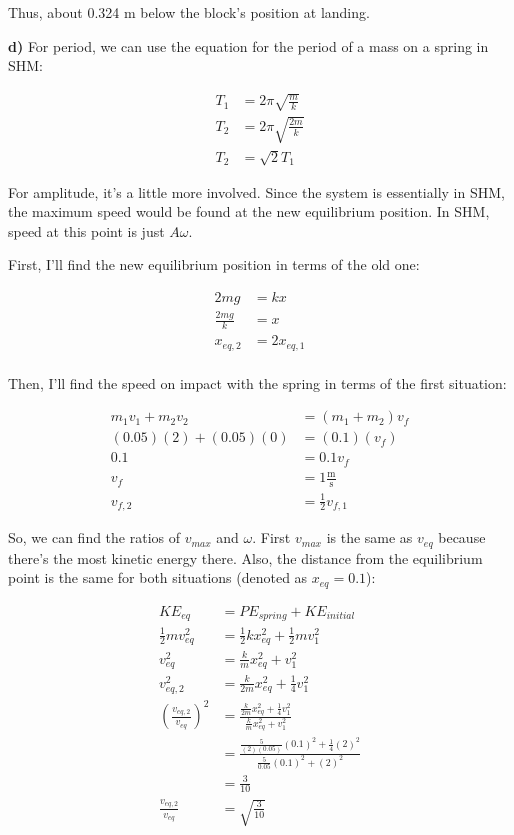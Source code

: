 \documentclass{article}
\begin{document}
Thus, about 0.324 m below the block's position at landing.

\vspace{1cm}

\large\textbf{d)} For period, we can use the equation for the period of a mass on a spring in SHM:

\begin{align*}
    T_1 &= 2\pi\sqrt{\frac{m}{k}} \\
    T_2 &= 2\pi\sqrt{\frac{2m}{k}} \\
    T_2 &= \sqrt{2}T_1
\end{align*}

For amplitude, it's a little more involved. Since the system is essentially in SHM, the maximum speed would be found at the new equilibrium position. In SHM, speed at this point is just $A\omega$.

First, I'll find the new equilibrium position in terms of the old one:

\begin{align*}
    2mg &= kx \\
    \frac{2mg}{k} &= x \\
    x_{eq,2} &= 2x_{eq,1} \\
\end{align*}

Then, I'll find the speed on impact with the spring in terms of the first situation:

\begin{align*}
    m_1v_1+m_2v_2 &= (m_1+m_2)v_f \\
    (0.05)(2) + (0.05)(0) &= (0.1)(v_f) \\
    0.1 &= 0.1v_f \\
    v_f &= 1 \frac{\text{m}}{\text{s}} \\
    v_{f,2} &= \frac{1}{2}v_{f,1} 
\end{align*}

So, we can find the ratios of $v_{max}$ and ${\omega}$. First $v_{max}$ is the same as $v_{eq}$ because there's the most kinetic energy there. Also, the distance from the equilibrium point is the same for both situations (denoted as $x_{eq}=0.1$):

\begin{align*}
    KE_{eq} &= PE_{spring} + KE_{initial} \\
    \frac{1}{2}mv_{eq}^2 &= \frac{1}{2}kx_{eq}^2 + \frac{1}{2}mv_1^2 \\
    v_{eq}^2 &= \frac{k}{m} x_{eq}^2 + v_1^2 \\
    v_{eq,2}^2 &= \frac{k}{2m} x_{eq}^2 + \frac{1}{4}v_1^2 \\
    \left(\frac{v_{eq,2}}{v_{eq}}\right)^2 &= \frac{\frac{k}{2m} x_{eq}^2 + \frac{1}{4}v_1^2}{\frac{k}{m} x_{eq}^2 + v_1^2} \\
    &= \frac{\frac{5}{(2)(0.05)} (0.1)^2 + \frac{1}{4}(2)^2}{\frac{5}{0.05} (0.1)^2 + (2)^2} \\
    &= \frac{3}{10} \\
    \frac{v_{eq,2}}{v_{eq}} &= \sqrt{\frac{3}{10}}
\end{align*}
\end{document}
